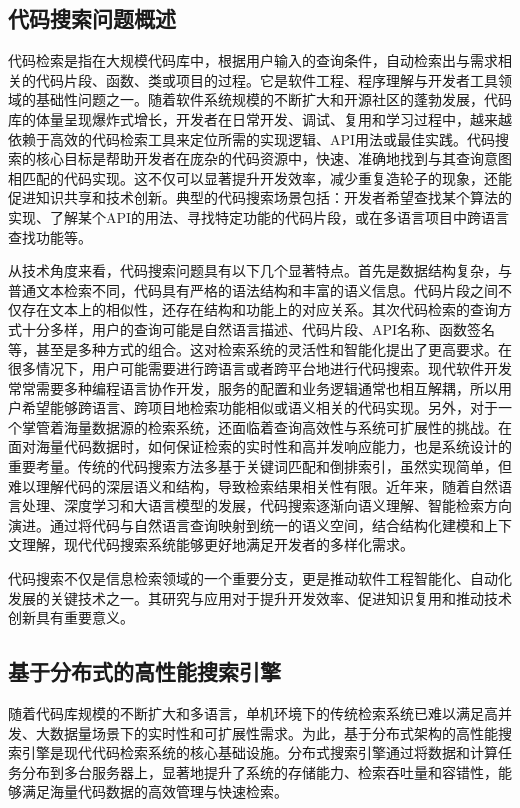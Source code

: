 \documentclass[UTF8,a4paper,12pt]{ctexart}
\numberwithin{equation}{section}
\begin{document}
\subsection{代码搜索问题概述}
代码检索是指在大规模代码库中，根据用户输入的查询条件，自动检索出与需求相关的代码片段、函数、类或项目的过程。它是软件工程、程序理解与开发者工具领域的基础性问题之一。随着软件系统规模的不断扩大和开源社区的蓬勃发展，代码库的体量呈现爆炸式增长，开发者在日常开发、调试、复用和学习过程中，越来越依赖于高效的代码检索工具来定位所需的实现逻辑、API用法或最佳实践。代码搜索的核心目标是帮助开发者在庞杂的代码资源中，快速、准确地找到与其查询意图相匹配的代码实现。这不仅可以显著提升开发效率，减少重复造轮子的现象，还能促进知识共享和技术创新。典型的代码搜索场景包括：开发者希望查找某个算法的实现、了解某个API的用法、寻找特定功能的代码片段，或在多语言项目中跨语言查找功能等。\par 
从技术角度来看，代码搜索问题具有以下几个显著特点。首先是数据结构复杂，与普通文本检索不同，代码具有严格的语法结构和丰富的语义信息。代码片段之间不仅存在文本上的相似性，还存在结构和功能上的对应关系。其次代码检索的查询方式十分多样，用户的查询可能是自然语言描述、代码片段、API名称、函数签名等，甚至是多种方式的组合。这对检索系统的灵活性和智能化提出了更高要求。在很多情况下，用户可能需要进行跨语言或者跨平台地进行代码搜索。现代软件开发常常需要多种编程语言协作开发，服务的配置和业务逻辑通常也相互解耦，所以用户希望能够跨语言、跨项目地检索功能相似或语义相关的代码实现。另外，对于一个掌管着海量数据源的检索系统，还面临着查询高效性与系统可扩展性的挑战。在面对海量代码数据时，如何保证检索的实时性和高并发响应能力，也是系统设计的重要考量。传统的代码搜索方法多基于关键词匹配和倒排索引，虽然实现简单，但难以理解代码的深层语义和结构，导致检索结果相关性有限。近年来，随着自然语言处理、深度学习和大语言模型的发展，代码搜索逐渐向语义理解、智能检索方向演进。通过将代码与自然语言查询映射到统一的语义空间，结合结构化建模和上下文理解，现代代码搜索系统能够更好地满足开发者的多样化需求。\par
代码搜索不仅是信息检索领域的一个重要分支，更是推动软件工程智能化、自动化发展的关键技术之一。其研究与应用对于提升开发效率、促进知识复用和推动技术创新具有重要意义。

\subsection{基于分布式的高性能搜索引擎}
随着代码库规模的不断扩大和多语言，单机环境下的传统检索系统已难以满足高并发、大数据量场景下的实时性和可扩展性需求。为此，基于分布式架构的高性能搜索引擎是现代代码检索系统的核心基础设施。分布式搜索引擎通过将数据和计算任务分布到多台服务器上，显著地提升了系统的存储能力、检索吞吐量和容错性，能够满足海量代码数据的高效管理与快速检索。
\end{document}
